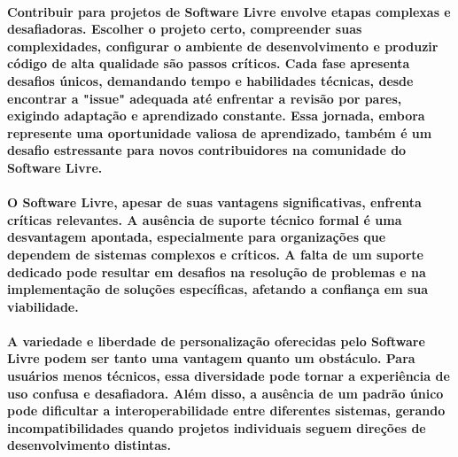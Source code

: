 \documentclass[a4paper, 12pt]{article}
\begin{document}
\paragraph{Contribuir para projetos de Software Livre envolve etapas complexas e desafiadoras. Escolher o projeto certo, compreender suas complexidades, configurar o ambiente de desenvolvimento e produzir código de alta qualidade são passos críticos. Cada fase apresenta desafios únicos, demandando tempo e habilidades técnicas, desde encontrar a "issue" adequada até enfrentar a revisão por pares, exigindo adaptação e aprendizado constante. Essa jornada, embora represente uma oportunidade valiosa de aprendizado, também é um desafio estressante para novos contribuidores na comunidade do Software Livre.}

\paragraph{O Software Livre, apesar de suas vantagens significativas, enfrenta críticas relevantes. A ausência de suporte técnico formal é uma desvantagem apontada, especialmente para organizações que dependem de sistemas complexos e críticos. A falta de um suporte dedicado pode resultar em desafios na resolução de problemas e na implementação de soluções específicas, afetando a confiança em sua viabilidade.}
\paragraph{A variedade e liberdade de personalização oferecidas pelo Software Livre podem ser tanto uma vantagem quanto um obstáculo. Para usuários menos técnicos, essa diversidade pode tornar a experiência de uso confusa e desafiadora. Além disso, a ausência de um padrão único pode dificultar a interoperabilidade entre diferentes sistemas, gerando incompatibilidades quando projetos individuais seguem direções de desenvolvimento distintas.}

\end{document}
